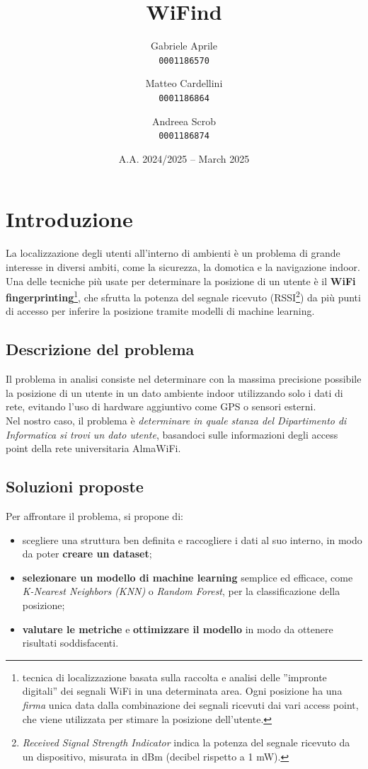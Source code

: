 \documentclass{article}
\title{{\myfont WiFind}}
\author{
    Gabriele Aprile\\
    \texttt{0001186570}
    \and
    Matteo Cardellini\\
    \texttt{0001186864}
    \and
    Andreea Scrob\\
    \texttt{0001186874}
}
\date{A.A. 2024/2025 -- March 2025}
\begin{document}
\maketitle

\begingroup
\hypersetup{hidelinks} 
\tableofcontents
\endgroup

\newpage

\section{Introduzione}
La localizzazione degli utenti all'interno di ambienti è un problema di grande interesse in diversi ambiti, come la sicurezza, la domotica e la navigazione indoor. Una delle tecniche più usate per determinare la posizione di un utente è il \textbf{WiFi fingerprinting}\footnote{tecnica di localizzazione basata sulla raccolta e analisi delle ''impronte digitali'' dei segnali WiFi in una determinata area. Ogni posizione ha una \textit{firma} unica data dalla combinazione dei segnali ricevuti dai vari access point, che viene utilizzata per stimare la posizione dell'utente.}, che sfrutta la potenza del segnale ricevuto (RSSI\footnote{\textit{Received Signal Strength Indicator} indica la potenza del segnale ricevuto da un dispositivo, misurata in dBm (decibel rispetto a 1 mW).}) da più punti di accesso per inferire la posizione tramite modelli di machine learning.

\subsection{Descrizione del problema}
Il problema in analisi consiste nel determinare con la massima precisione possibile la posizione di un utente in un dato ambiente indoor utilizzando solo i dati di rete, evitando l'uso di hardware aggiuntivo come GPS o sensori esterni. \\

Nel nostro caso, il problema è \textit{determinare in quale stanza del Dipartimento di Informatica si trovi un dato utente}, basandoci sulle informazioni degli access point della rete universitaria AlmaWiFi.

\subsection{Soluzioni proposte}
Per affrontare il problema, si propone di:
\begin{itemize}
    \item scegliere una struttura ben definita e raccogliere i dati al suo interno, in modo da poter \textbf{creare un dataset};
    \item \textbf{selezionare un modello di machine learning} semplice ed efficace, come \textit{K-Nearest Neighbors (KNN)} o \textit{Random Forest}, per la classificazione della posizione;
    \item \textbf{valutare le metriche} e \textbf{ottimizzare il modello} in modo da ottenere risultati soddisfacenti.
\end{itemize}
\end{document}
